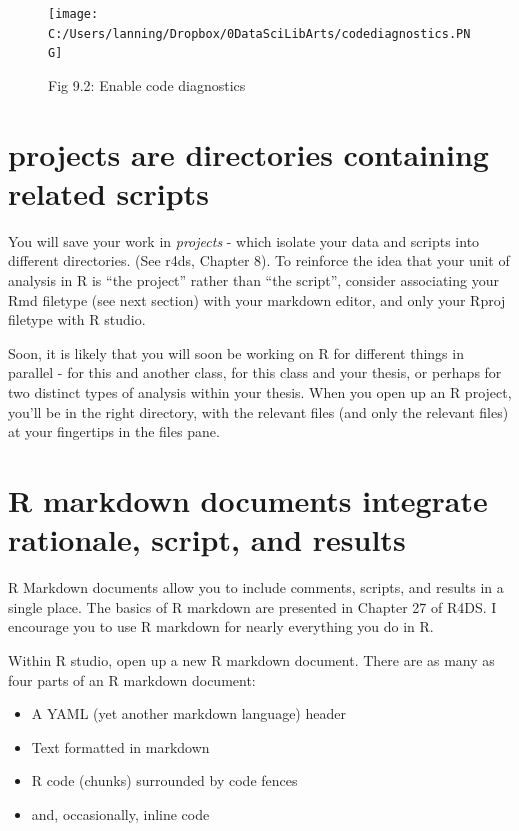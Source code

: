 \documentclass[
  openany]{book}
\providecommand{\tightlist}{%
  \setlength{\itemsep}{0pt}\setlength{\parskip}{0pt}}
\begin{document}
\begin{figure}
\centering
\texttt{[image: C:/Users/lanning/Dropbox/0DataSciLibArts/codediagnostics.PNG]}
\caption{Fig 9.2: Enable code diagnostics}
\end{figure}

\hypertarget{projects-are-directories-containing-related-scripts}{%
\section{projects are directories containing related scripts}\label{projects-are-directories-containing-related-scripts}}

You will save your work in \emph{projects} - which isolate your data and scripts into different directories. (See r4ds, Chapter 8). To reinforce the idea that your unit of analysis in R is ``the project'' rather than ``the script'', consider associating your Rmd filetype (see next section) with your markdown editor, and only your Rproj filetype with R studio.

Soon, it is likely that you will soon be working on R for different things in parallel - for this and another class, for this class and your thesis, or perhaps for two distinct types of analysis within your thesis. When you open up an R project, you'll be in the right directory, with the relevant files (and only the relevant files) at your fingertips in the files pane.

\hypertarget{r-markdown-documents-integrate-rationale-script-and-results}{%
\section{R markdown documents integrate rationale, script, and results}\label{r-markdown-documents-integrate-rationale-script-and-results}}

R Markdown documents allow you to include comments, scripts, and results in a single place. The basics of R markdown are presented in Chapter 27 of R4DS. I encourage you to use R markdown for nearly everything you do in R.

Within R studio, open up a new R markdown document. There are as many as four parts of an R markdown document:

\begin{itemize}
\tightlist
\item
  A YAML (yet another markdown language) header
\item
  Text formatted in markdown
\item
  R code (chunks) surrounded by code fences
\item
  and, occasionally, inline code
\end{itemize}
\end{document}
